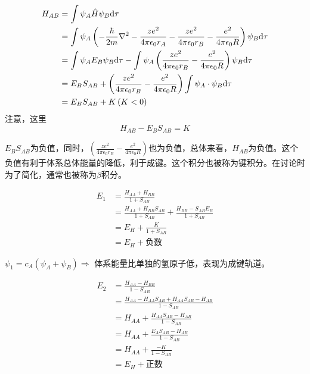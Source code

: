 \begin{align*}
    H_{AB} & = \int \psi_A \hat{H} \psi_B \mathrm{d} \tau                                                                                                                                     \\
           & = \int \psi_A \left( -\frac{\hbar}{2m} \nabla^2 - \frac{ze^2}{4\pi\epsilon_0r_A} - \frac{ze^2}{4\pi\epsilon_0r_B} -  \frac{e^2}{4\pi\epsilon_0R}  \right) \psi_B \mathrm{d} \tau \\
           & = \int \psi_A E_B \psi_B \mathrm{d} \tau - \int \psi_A \left(\frac{ze^2}{4\pi\epsilon_0r_B} - \frac{e^2}{4\pi\epsilon_0R} \right) \psi_B \mathrm{d} \tau                                 \\
           & = E_BS_{AB} +  \left(\frac{ze^2}{4\pi\epsilon_0r_B} - \frac{e^2}{4\pi\epsilon_0R} \right) \int \psi_A \cdot \psi_B \mathrm{d} \tau                                               \\
           & = E_BS_{AB} + K \left( K < 0 \right)                                                                                                                                     \\
\end{align*}
注意，这里
\begin{equation*}
    H_{AB} - E_BS_{AB} = K
\end{equation*}

$E_BS_{AB}$为负值，同时，$\left(\frac{ze^2}{4\pi\epsilon_0r_B} - \frac{e^2}{4\pi\epsilon_0R} \right)$也为负值，总体来看，$H_{AB}$为负值。这个负值有利于体系总体能量的降低，利于成键。这个积分也被称为键积分。在讨论时为了简化，通常也被称为$\beta$积分。


\begin{align*}
    E_1 & = \frac{H_{AA} + H_{BB}}{1 + S_{AB}}                                               \\
        & = \frac{H_{AA} + H_{BB}S_{AB}}{1 + S_{AB}} + \frac{H_{BB} - S_{AB}E_B}{1 + S_{AB}} \\
        & = E_H + \frac{K}{1 + S_{AB}}                                                       \\
        & = E_H + \mbox{负数}
\end{align*}

$\psi_1 = c_A \left( \psi_A + \psi_B \right) \Rightarrow$ 体系能量比单独的氢原子低，表现为成键轨道。

\begin{align*}
    E_2 & = \frac{H_{AA} - H_{BB}}{1 - S_{AB}}                               \\
        & = \frac{H_{AA} - H_{AA}S_{AB} + H_{AA}S_{AB} - H_{AB}}{1 - S_{AB}} \\
        & = H_{AA} + \frac{H_{AA}S_{AB} - H_{AB}}{1 - S_{AB}}                \\
        & = H_{AA} + \frac{E_AS_{AB} - H_{AB}}{1 - S_{AB}}                   \\
        & = H_{AA} + \frac{-K}{1 - S_{AB}}                                   \\
        & = E_H + \mbox{正数}
\end{align*}


